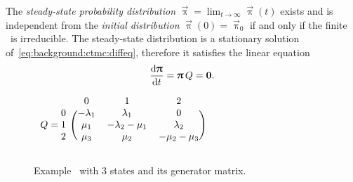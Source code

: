 The \emph{steady-state probability distribution}
$\vec{\uppi} = \lim_{t \to \infty} \vec{\uppi}(t)$ exists and is
independent from the \emph{initial distribution}
$\vec{\uppi}(0) = \vec{\uppi}_0$ if and only if the finite \CTMC\ is
irreducible. The steady-state distribution is a stationary solution
of~\cref{eq:background:ctmc:diffeq}, therefore it satisfies the linear
equation
\begin{equation}
  \label{eq:background:ctmc:steadystate}
  \frac{\mathrm{d} \bm{\mathrm{\uppi}}}{\mathrm{d} t} = \bm{\mathrm{\uppi}} \, Q = \bm{\mathrm{0}}
  \text.
\end{equation}

\begin{figure}
  \begin{minipage}{.49\linewidth}
    \centering
  \end{minipage}
  \begin{minipage}{.49\linewidth}
    \centering
    $\begin{blockarray}{rccc}
      & 0 & 1 & 2 \\
      \begin{block}{r(ccc)}
        0 & -\lambda_1 & \lambda_1 & 0 \\
        Q = 1 & \mu_1 & -\lambda_2 - \mu_1 & \lambda_2 \\
        2 & \mu_3 & \mu_2 & -\mu_2 - \mu_3 \\
      \end{block}
    \end{blockarray}$
    \vspace{0.5cm}
  \end{minipage}
  \caption{Example \CTMC\ with 3 states and its generator matrix.}
  \label{fig:background:ctmc:repair}
\end{figure}

